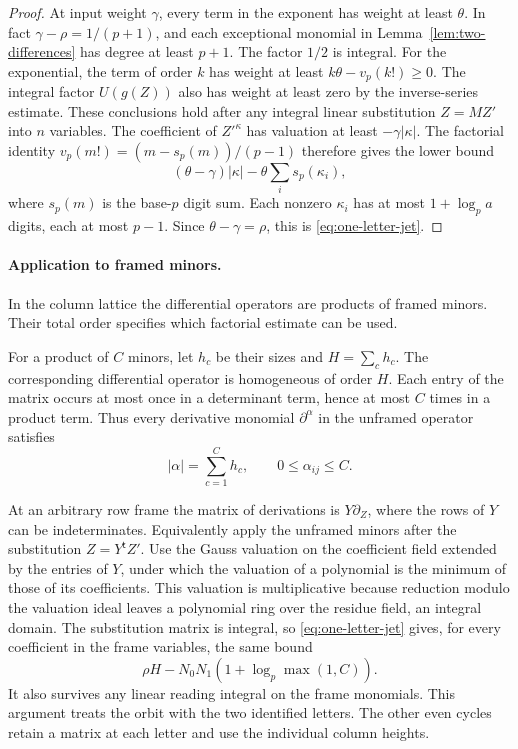 \begin{proof}
At input weight \(\gamma\), every term in
the exponent has weight at least \(\theta\). In fact
\(\gamma-\rho=1/(p+1)\), and each exceptional monomial in
Lemma~\ref{lem:two-differences} has degree at least \(p+1\).
The factor \(1/2\) is integral. For the exponential, the term
of order \(k\) has weight at least \(k\theta-v_p(k!)\ge0\).
The integral factor \(U(g(Z))\) also has weight at least zero by
the inverse-series estimate. These conclusions hold after any
integral linear substitution \(Z=MZ'\) into \(n\) variables.
The coefficient of \({Z'}^\kappa\) has valuation at least
\(-\gamma|\kappa|\). The factorial identity
\(v_p(m!)=(m-s_p(m))/(p-1)\) therefore gives the lower bound
\[
 (\theta-\gamma)|\kappa|-\theta\sum_i s_p(\kappa_i),
\]
where \(s_p(m)\) is the base-\(p\) digit sum. Each nonzero
\(\kappa_i\) has at most \(1+\log_p a\) digits, each at most
\(p-1\). Since \(\theta-\gamma=\rho\), this is
\eqref{eq:one-letter-jet}.
\end{proof}

\paragraph{Application to framed minors.}

In the column lattice the differential operators are products of framed minors. Their total order specifies which factorial estimate can be used.

For a product of \(C\) minors, let \(h_c\) be their sizes and
\(H=\sum_c h_c\). The corresponding differential operator is
homogeneous of order \(H\). Each entry of the matrix occurs
at most once in a determinant term, hence at most \(C\) times
in a product term.
Thus every derivative monomial \(\partial^\alpha\) in the unframed operator satisfies
\[
  |\alpha|=\sum_{c=1}^C h_c,\qquad 0\le\alpha_{ij}\le C.
\]

At an arbitrary row frame the matrix of
derivations is \(Y\partial_Z\), where the rows of \(Y\) can
be indeterminates. Equivalently apply the unframed minors after
the substitution \(Z=Y^{\mathsf t}Z'\). Use the Gauss valuation
on the coefficient field extended by the entries of \(Y\), under
which the valuation of a polynomial is the minimum of those of
its coefficients. This valuation is multiplicative because
reduction modulo the valuation ideal leaves a polynomial ring
over the residue field, an integral domain. The substitution
matrix is integral, so \eqref{eq:one-letter-jet} gives, for every
coefficient in the frame variables, the same bound
\[
               \rho H-N_0N_1(1+\log_p\max(1,C)).
\]
It also survives any linear reading integral on the frame monomials.
This argument treats the orbit with the two identified letters.
The other even cycles retain a matrix at each letter and use the
individual column heights.

